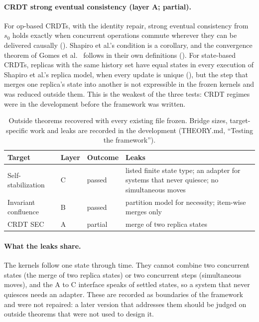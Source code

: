 \paragraph{CRDT strong eventual consistency (layer A; partial).}
For op-based CRDTs, with the identity repair, strong eventual consistency from $s_0$ holds exactly when
concurrent operations commute wherever they can be delivered causally (). Shapiro et
al.'s condition is a corollary, and the convergence theorem of Gomes et al.~\cite{gomes2017} follows
in their own definitions (). For state-based CRDTs, replicas with the same
history set have equal states in every execution of Shapiro et al.'s replica model, when every update
is unique (),
but the step that merges one replica's state into another is not expressible in the frozen kernels and
was reduced outside them. This is the weakest of the three tests: CRDT regimes were in the development
before the framework was written.

\begin{table}[t]
\centering\small
\begin{tabular}{@{}lllp{8.4cm}@{}}
\toprule
Target & Layer & Outcome & Leaks \\
\midrule
Self-stabilization & C & passed & listed finite state type; an adapter for systems that never quiesce; no simultaneous moves \\
Invariant confluence & B & passed & partition model for necessity; item-wise merges only \\
CRDT SEC & A & partial & merge of two replica states \\
\bottomrule
\end{tabular}
\caption{Outside theorems recovered with every existing file frozen. Bridge sizes, target-specific work
and leaks are recorded in the development (THEORY.md, ``Testing the framework'').}
\label{tab:outside}
\end{table}

\paragraph{What the leaks share.}
The kernels follow one state through time. They cannot combine two concurrent states (the merge of
two replica states) or two concurrent steps (simultaneous moves), and the A to C interface speaks of
settled states, so a system that never quiesces needs an adapter. These are recorded as boundaries of
the framework and were not repaired: a later version that addresses them should be judged on outside
theorems that were not used to design it.

